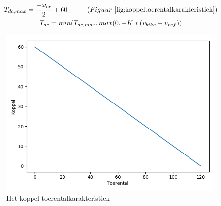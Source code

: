 \begin{gather*}
T_{dc,max} = \frac{-\omega_{cr}}{2}+60 \tab (Figuur\ \ref{fig:koppeltoerentalkarakteristiek}) \\
T_{dc} = min(T_{dc,max},max(0,-K*(v_{bike}-v_{ref}))
\end{gather*}

\begin{figure}
  \includegraphics[width=\linewidth]{images/koppel-toerentalkarakteristiek.png}
  \caption{Het koppel-toerentalkarakteristiek}
  \label{fig:koppeltoerentalkarakteristiek}
\end{figure}

